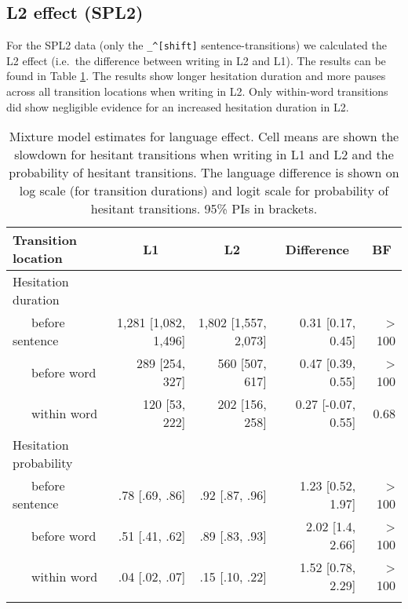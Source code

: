 \clearpage
\makeatletter
\efloat@restorefloats
\makeatother


\begin{appendix}
\section{}
\hypertarget{l2-effect-spl2}{%
\subsection{L2 effect (SPL2)}\label{l2-effect-spl2}}

For the SPL2 data (only the \texttt{\_\^{}{[}shift{]}}
sentence-transitions) we calculated the L2 effect (i.e.~the difference
between writing in L2 and L1). The results can be found in Table
\ref{tab:l2effect}. The results show longer hesitation duration and more
pauses across all transition locations when writing in L2. Only
within-word transitions did show negligible evidence for an increased
hesitation duration in L2.

\begin{table}[b]

\begin{center}
\begin{threeparttable}

\caption{\label{tab:l2effect}Mixture model estimates for language effect. Cell means are shown the slowdown for hesitant transitions when writing in L1 and L2 and the probability of hesitant transitions. The language difference is shown on log scale (for transition durations) and logit scale for probability of hesitant transitions. 95\% PIs in brackets.}

\small{

\begin{tabular}{lrrrr}
\toprule
Transition location & \multicolumn{1}{c}{L1} & \multicolumn{1}{c}{L2} & \multicolumn{1}{c}{Difference} & \multicolumn{1}{c}{BF}\\
\midrule
Hesitation duration &  &  &  & \\
\ \ \ before sentence & 1,281 [1,082, 1,496] & 1,802 [1,557, 2,073] & 0.31 [0.17, 0.45] & > 100\\
\ \ \ before word & 289 [254, 327] & 560 [507, 617] & 0.47 [0.39, 0.55] & > 100\\
\ \ \ within word & 120 [53, 222] & 202 [156, 258] & 0.27 [-0.07, 0.55] & 0.68\\
Hesitation probability &  &  &  & \\
\ \ \ before sentence & .78 [.69, .86] & .92 [.87, .96] & 1.23 [0.52, 1.97] & > 100\\
\ \ \ before word & .51 [.41, .62] & .89 [.83, .93] & 2.02 [1.4, 2.66] & > 100\\
\ \ \ within word & .04 [.02, .07] & .15 [.10, .22] & 1.52 [0.78, 2.29] & > 100\\
\bottomrule
\addlinespace
\end{tabular}

}
\end{threeparttable}
\end{center}
\end{table}
\end{appendix}
